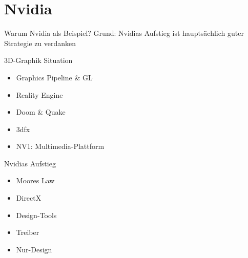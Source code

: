 \section{Nvidia}

\begin{frame}[c]{Warum Nvidia als Beispiel?}
    \Large
    Grund: Nvidias Aufstieg ist hauptsächlich guter Strategie zu verdanken
\end{frame}



\begin{frame}[c]{3D-Graphik Situation}
    \Large
    \begin{itemize}
        \item Graphics Pipeline \& GL
            \pause
        \item Reality Engine
            \pause
        \item Doom \& Quake
            \pause
        \item 3dfx
            \pause
        \item NV1: Multimedia-Plattform
            \pause
    \end{itemize}
\end{frame}


\begin{frame}[c]{Nvidias Aufstieg}
    \Large
    \begin{itemize}
        \item Moores Law
            \pause
        \item DirectX
            \pause
        \item Design-Tools
            \pause
        \item Treiber
            \pause
        \item Nur-Design
    \end{itemize}
\end{frame}



